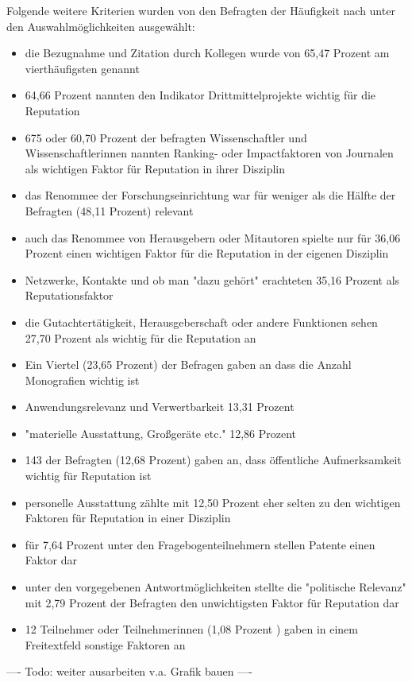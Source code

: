 Folgende weitere Kriterien wurden von den Befragten der Häufigkeit nach unter den Auswahlmöglichkeiten ausgewählt:
\begin{itemize}
\item die Bezugnahme und Zitation durch Kollegen wurde von 65,47 Prozent am vierthäufigsten genannt
\item 64,66 Prozent nannten den Indikator Drittmittelprojekte wichtig für die Reputation
\item 675 oder 60,70 Prozent der befragten Wissenschaftler und Wissenschaftlerinnen nannten Ranking- oder Impactfaktoren von Journalen als wichtigen Faktor für Reputation in ihrer Disziplin
\item das Renommee der Forschungseinrichtung war für weniger als die Hälfte der Befragten (48,11 Prozent) relevant
\item auch das Renommee von Herausgebern oder Mitautoren spielte nur für 36,06 Prozent einen wichtigen Faktor für die Reputation in der eigenen Disziplin
\item Netzwerke, Kontakte und ob man "dazu gehört" erachteten 35,16 Prozent als Reputationsfaktor
\item die Gutachtertätigkeit, Herausgeberschaft oder andere Funktionen sehen 27,70 Prozent als wichtig für die Reputation an
\item Ein Viertel (23,65 Prozent) der Befragen gaben an dass die Anzahl Monografien wichtig ist
\item Anwendungsrelevanz und Verwertbarkeit 13,31 Prozent
\item "materielle Ausstattung, Großgeräte etc." 12,86 Prozent
\item 143 der Befragten (12,68 Prozent) gaben an, dass öffentliche Aufmerksamkeit wichtig für Reputation ist
\item personelle Ausstattung zählte mit 12,50 Prozent eher selten zu den wichtigen Faktoren für Reputation in einer Disziplin
\item für 7,64 Prozent unter den Fragebogenteilnehmern stellen Patente einen Faktor dar
\item unter den vorgegebenen Antwortmöglichkeiten stellte die "politische Relevanz" mit 2,79 Prozent der Befragten den unwichtigsten Faktor für Reputation dar
\item 12 Teilnehmer oder Teilnehmerinnen (1,08 Prozent ) gaben in einem Freitextfeld sonstige Faktoren an
\end{itemize}

---- Todo: weiter ausarbeiten v.a. Grafik bauen ----

